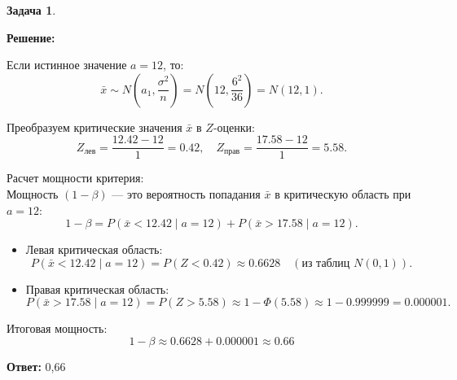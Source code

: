 \documentclass[a4paper,11pt]{article}
\newenvironment{shdd}{\begin{mdframed}[backgroundcolor=shadecolor]}{\end{mdframed}}
\theoremstyle{definition}
\newtheorem{problem}{Задача}\setlength{\parindent}{0pt}
\newenvironment{solution}
{\begin{shdd}
     \textbf{Решение:}\par\setlength{\parindent}{0pt}}
     {
\end{shdd}}
\newenvironment{answer}
{\par\noindent\textbf{Ответ:}}
{\par}
\begin{document}
\begin{problem}
\begin{solution}
            Если истинное значение \(a = 12\), то:
            \[
                \bar{x} \sim N\left(a_1, \frac{\sigma^2}{n}\right) = N\left(12, \frac{6^2}{36}\right) = N(12, 1).
            \]

            Преобразуем критические значения \(\bar{x}\) в \(Z\)-оценки:
            \[
                Z_{\text{лев}} = \frac{12.42 - 12}{1} = 0.42, \quad Z_{\text{прав}} = \frac{17.58 - 12}{1} = 5.58.
            \]

            Расчет мощности критерия:
            \\
            Мощность \((1-\beta)\) — это вероятность попадания \(\bar{x}\) в критическую область при \(a = 12\):
            \[
                1 - \beta = P(\bar{x} < 12.42 \mid a=12) + P(\bar{x} > 17.58 \mid a=12).
            \]

            \begin{itemize}
                \item Левая критическая область:
                \[
                    P(\bar{x} < 12.42 \mid a=12) = P\left(Z < 0.42\right) \approx 0.6628 \quad (\text{из таблиц } N(0,1)).
                \]

                \item Правая критическая область:
                \[
                    P(\bar{x} > 17.58 \mid a=12) = P\left(Z > 5.58\right) \approx 1 - \Phi(5.58) \approx 1 - 0.999999 = 0.000001.
                \]
            \end{itemize}

            Итоговая мощность:
            \[
                1 - \beta \approx 0.6628 + 0.000001 \approx 0.66
            \]
        \end{solution}

        \begin{answer}
            0,66
        \end{answer}

    \end{problem}
\end{document}
